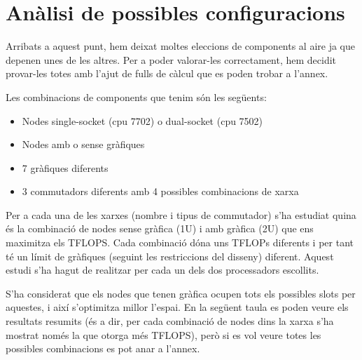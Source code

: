 \section{Anàlisi de possibles configuracions}

Arribats a aquest punt, hem deixat moltes eleccions de components al aire ja que depenen unes de les altres. Per a poder valorar-les correctament, hem decidit provar-les totes amb l'ajut de fulls de càlcul que es poden trobar a l'annex.

Les combinacions de components que tenim són les següents:
\begin{itemize}
    \item {Nodes single-socket (cpu 7702) o dual-socket (cpu 7502)}
    \item {Nodes amb o sense gràfiques}
    \item {7 gràfiques diferents}
    \item {3 commutadors diferents amb 4 possibles combinacions de xarxa}
\end{itemize}



Per a cada una de les xarxes (nombre i tipus de commutador) s'ha estudiat quina és la combinació de nodes sense gràfica (1U) i amb gràfica (2U) que ens maximitza els TFLOPS. Cada combinació dóna uns TFLOPs diferents i per tant té un límit de gràfiques (seguint les restriccions del disseny) diferent. Aquest estudi s'ha hagut de realitzar per cada un dels dos processadors escollits.

S'ha considerat que els nodes que tenen gràfica ocupen tots els possibles slots per aquestes, i així s'optimitza millor l'espai. En la següent taula es poden veure els resultats resumits (és a dir, per cada combinació de nodes dins la xarxa s'ha mostrat només la que otorga més TFLOPS), però si es vol veure totes les possibles combinacions es pot anar a l'annex.

